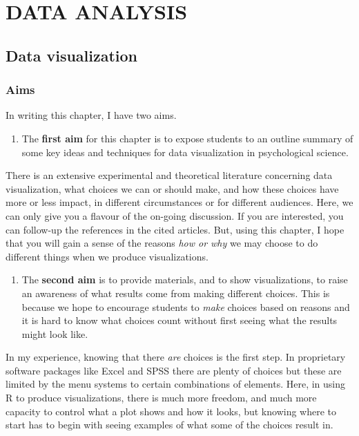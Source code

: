 \documentclass[
  letterpaper,
  DIV=11,
  numbers=noendperiod]{scrreprt}
\providecommand{\tightlist}{%
  \setlength{\itemsep}{0pt}\setlength{\parskip}{0pt}}\usepackage{longtable,booktabs,array}
\begin{document}
\part{DATA ANALYSIS}


\hypertarget{data-visualization}{%
\chapter{Data visualization}\label{data-visualization}}

\hypertarget{sec-aims}{%
\section{Aims}\label{sec-aims}}

In writing this chapter, I have two aims.

\begin{enumerate}
\def\labelenumi{\arabic{enumi}.}
\tightlist
\item
  The \textbf{first aim} for this chapter is to expose students to an
  outline summary of some key ideas and techniques for data
  visualization in psychological science.
\end{enumerate}

There is an extensive experimental and theoretical literature concerning
data visualization, what choices we can or should make, and how these
choices have more or less impact, in different circumstances or for
different audiences. Here, we can only give you a flavour of the
on-going discussion. If you are interested, you can follow-up the
references in the cited articles. But, using this chapter, I hope that
you will gain a sense of the reasons \emph{how or why} we may choose to
do different things when we produce visualizations.

\begin{enumerate}
\def\labelenumi{\arabic{enumi}.}
\setcounter{enumi}{1}
\tightlist
\item
  The \textbf{second aim} is to provide materials, and to show
  visualizations, to raise an awareness of what results come from making
  different choices. This is because we hope to encourage students to
  \emph{make} choices based on reasons and it is hard to know what
  choices count without first seeing what the results might look like.
\end{enumerate}

In my experience, knowing that there \emph{are} choices is the first
step. In proprietary software packages like Excel and SPSS there are
plenty of choices but these are limited by the menu systems to certain
combinations of elements. Here, in using R to produce visualizations,
there is much more freedom, and much more capacity to control what a
plot shows and how it looks, but knowing where to start has to begin
with seeing examples of what some of the choices result in.
\end{document}
